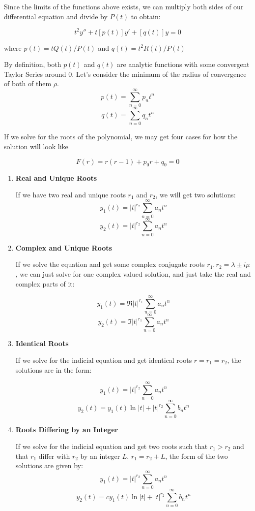 \documentclass{report}
\begin{document}
{	
	Since the limits of the functions above exists, we can multiply both sides of our differential equation and divide by $P(t)$ to obtain:
	
	$$t^2y'' + t[p(t)]y' + [q(t)]y = 0$$
	
	where $p(t) = tQ(t)/P(t)$ and $q(t) = t^2R(t)/P(t)$
	
	
	By definition, both $p(t)$ and $q(t)$ are analytic functions with some convergent Taylor Series around $0$. Let's consider the minimum of the radius of convergence of both of them $\rho$.
	$$p(t) = \sum_{n=0}^\infty p_nt^n$$
	$$q(t) = \sum_{n=0}^\infty q_nt^n$$
	
	If we solve for the roots of the polynomial, we may get four cases for how the solution will look like
	
	$$F(r) = r(r-1) + p_0r + q_0 = 0$$
	
	\begin{enumerate}
		\item \textbf{Real and Unique Roots}
		
		If we have two real and unique roots $r_1$ and $r_2$, we will get two solutions:
		$$y_1(t) = |t|^{r_2}\sum_{n=0}^\infty a_nt^n$$
		$$y_2(t) = |t|^{r_2}\sum_{n=0}^\infty a_nt^n$$
		
		\item \textbf{Complex and Unique Roots}
		
		If we solve the equation and get some complex conjugate roots $r_1, r_2 = \lambda \pm i\mu$, we can just solve for one complex valued solution, and just take the real and complex parts of it:
		
		$$y_1(t) = \Re{|t|^{r_1}\sum_{n=0}^\infty a_nt^n}$$
		$$y_2(t) = \Im{|t|^{r_1}\sum_{n=0}^\infty a_nt^n}$$
		
		\item \textbf{Identical Roots}
		
		If we solve for the indicial equation and get identical roots $r=r_1=r_2$, the solutions are in the form:
		
		$$y_1(t) = |t|^{r_2}\sum_{n=0}^\infty a_nt^n$$
		$$y_2(t) = y_1(t)\ln|t| + |t|^{r_2}\sum_{n=0}^\infty b_nt^n$$
		
		\item \textbf{Roots Differing by an Integer}
		
		
		If we solve for the indicial equation and get two roots such that $r_1 > r_2$ and that $r_1$ differ with $r_2$ by an integer $L$, $r_1 = r_2 + L$, the form of the two solutions are given by:
		$$y_1(t) = |t|^{r_2}\sum_{n=0}^\infty a_nt^n$$
		$$y_2(t) = cy_1(t)\ln|t| + |t|^{r_2}\sum_{n=0}^\infty b_nt^n$$
		

\end{enumerate}}
\end{document}
